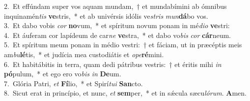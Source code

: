 {2.~}Et effúndam super vos aquam mundam,~† et mundabímini ab ómnibus inquinamén\textit{tis} \textbf{ve}stris,~* et ab univérsis idólis ve\textit{stris} \textit{mun}\textbf{dá}bo vos.\\
{3.~}Et dabo vobis \textit{cor} \textbf{no}vum,~* et spíritum novum ponam in mé\textit{di}\textit{o} \textbf{ve}stri:\\
{4.~}Et áuferam cor lapídeum de car\textit{ne} \textbf{ve}stra,~* et dabo vo\textit{bis} \textit{cor} \textbf{cár}neum.\\
{5.~}Et spíritum meum ponam in médio vestri:~† et fáciam, ut in præcéptis meis am\textit{bu}\textbf{lé}tis,~* et judícia mea custodiátis et \textit{o}\textit{pe}\textbf{ré}mini.\\
{6.~}Et habitábitis in terra, quam dedi pátribus vestris:~† et éritis mihi \textit{in} \textbf{pó}pulum,~* et ego ero vo\textit{bis} \textit{in} \textbf{De}um.\\
{7.~}Glória Patri, \textit{et} \textbf{Fí}lio,~* et Spirí\textit{tu}\textit{i} \textbf{San}cto.\\
{8.~}Sicut erat in princípio, et nunc, \textit{et} \textbf{sem}per,~* et in sǽcula sæcu\textit{ló}\textit{rum}. \textbf{A}men.\\
